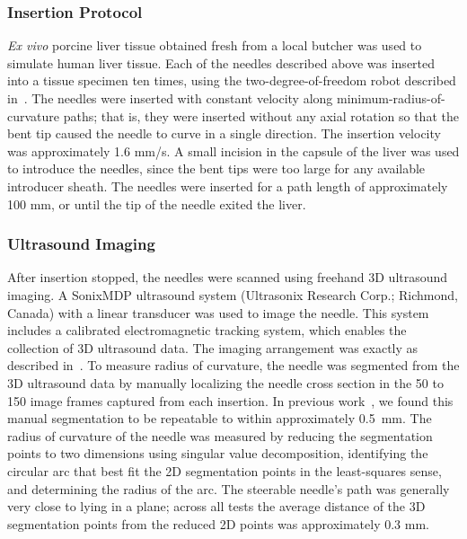 \subsubsection{Insertion Protocol}
\textit{Ex vivo} porcine liver tissue obtained fresh from a local butcher was used to simulate human liver tissue. Each of the needles described above was inserted into a tissue specimen ten times, using the two-degree-of-freedom robot described in~\cite{Adebar2014}. The needles were inserted with constant velocity along minimum-radius-of-curvature paths; that is, they were inserted without any axial rotation so that the bent tip caused the needle to curve in a single direction. The insertion velocity was approximately 1.6 mm/s. A small incision in the capsule of the liver was used to introduce the needles, since the bent tips were too large for any available introducer sheath. The needles were inserted for a path length of approximately 100 mm, or until the tip of the needle exited the liver. 

\subsubsection{Ultrasound Imaging}
After insertion stopped, the needles were scanned using freehand 3D ultrasound imaging. A SonixMDP ultrasound system (Ultrasonix Research Corp.; Richmond, Canada) with a linear transducer was used to image the needle. This system includes a calibrated electromagnetic tracking system, which enables the collection of 3D ultrasound data. The imaging arrangement was exactly as described in~\cite{Greer2014}. To measure radius of curvature, the needle was segmented from the 3D ultrasound data by manually localizing the needle cross section in the 50 to 150 image frames captured from each insertion. In previous work~\cite{Adebar2014}, we found this manual segmentation to be repeatable to within approximately 0.5~mm. The radius of curvature of the needle was measured by reducing the segmentation points to two dimensions using singular value decomposition, identifying the circular arc that best fit the 2D segmentation points in the least-squares sense, and determining the radius of the arc. The steerable needle's path was generally very close to lying in a plane; across all tests the average distance of the 3D segmentation points from the reduced 2D points was approximately 0.3 mm.

